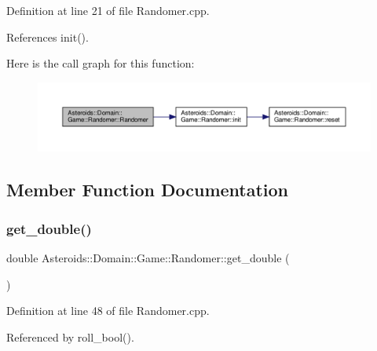 Definition at line 21 of file Randomer.\+cpp.



References init().

Here is the call graph for this function\+:\nopagebreak
\begin{figure}[H]
\begin{center}
\leavevmode
\includegraphics[width=350pt]{classAsteroids_1_1Domain_1_1Game_1_1Randomer_a8e660c706ed181bde7b6f6310285b8e9_cgraph}
\end{center}
\end{figure}


\subsection{Member Function Documentation}
\mbox{\label{classAsteroids_1_1Domain_1_1Game_1_1Randomer_a43965ff48fe73e5eef6e1c223a94f463}} 
\subsubsection{\texorpdfstring{get\+\_\+double()}{get\_double()}\hspace{0.1cm}{\footnotesize\ttfamily [1/2]}}
{\footnotesize\ttfamily double Asteroids\+::\+Domain\+::\+Game\+::\+Randomer\+::get\+\_\+double (\begin{DoxyParamCaption}{ }\end{DoxyParamCaption})}



Definition at line 48 of file Randomer.\+cpp.



Referenced by roll\+\_\+bool().

